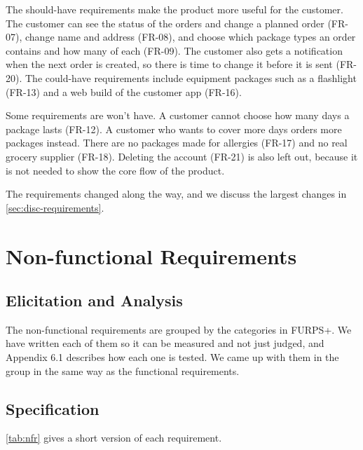 The should-have requirements make the product more useful for the customer. The
customer can see the status of the orders and change a planned order (FR-07), change
name and address (FR-08), and choose which package types an order contains and how
many of each (FR-09). The customer also gets a notification when the next order is
created, so there is time to change it before it is sent (FR-20). The could-have
requirements include equipment packages such as a flashlight (FR-13) and a web build of
the customer app (FR-16).

Some requirements are won't have. A customer cannot choose how many days a package
lasts (FR-12). A customer who wants to cover more days orders more packages instead.
There are no packages made for allergies (FR-17) and no real grocery supplier (FR-18).
Deleting the account (FR-21) is also left out, because it is not needed to show the
core flow of the product.

The requirements changed along the way, and we discuss the largest changes in
\autoref{sec:disc-requirements}.

\section{Non-functional Requirements}\label{sec:req-nonfunctional}

\subsection{Elicitation and Analysis}\label{sec:req-nfr-analysis}

The non-functional requirements are grouped by the categories in FURPS+. We have written
each of them so it can be measured and not just judged, and Appendix 6.1 describes how
each one is tested.
We came up with them in the group in the same way as the functional requirements.

\subsection{Specification}\label{sec:req-nfr-specification}
 \autoref{tab:nfr} gives a short version of each requirement.

